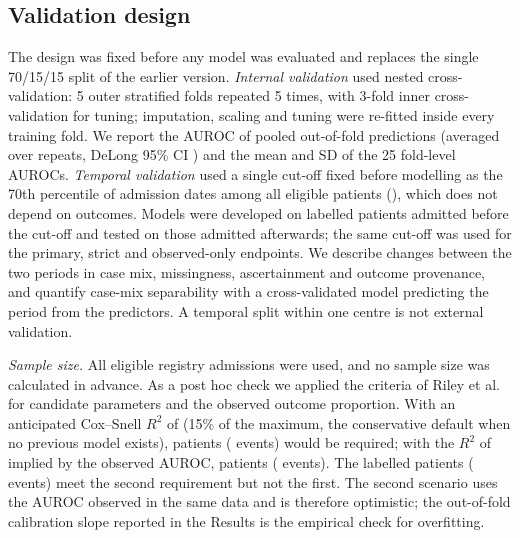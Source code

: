\documentclass[preprint,10pt]{elsarticle}
\begin{document}
\subsection{Validation design}
\label{sec:validation}
The design was fixed before any model was evaluated and replaces the single 70/15/15 split of the earlier version. \emph{Internal validation} used nested cross-validation: 5 outer stratified folds repeated 5 times, with 3-fold inner cross-validation for tuning; imputation, scaling and tuning were re-fitted inside every training fold. We report the AUROC of pooled out-of-fold predictions (averaged over repeats, DeLong 95\% CI \cite{delong1988comparing,sun2014fastdelong}) and the mean and SD of the 25 fold-level AUROCs. \emph{Temporal validation} used a single cut-off fixed before modelling as the 70th percentile of admission dates among all eligible patients (\TCut), which does not depend on outcomes. Models were developed on labelled patients admitted before the cut-off and tested on those admitted afterwards; the same cut-off was used for the primary, strict and observed-only endpoints. We describe changes between the two periods in case mix, missingness, ascertainment and outcome provenance, and quantify case-mix separability with a cross-validated model predicting the period from the predictors. A temporal split within one centre is not external validation.

\emph{Sample size.} All eligible registry admissions were used, and no sample size was calculated in advance. As a post hoc check we applied the criteria of Riley et al.\ \cite{riley2020samplesize} for \Ncand{} candidate parameters and the observed outcome proportion. With an anticipated Cox--Snell $R^2$ of \RileyConsRsq{} (15\% of the maximum, the conservative default when no previous model exists), \RileyConsN{} patients (\RileyConsE{} events) would be required; with the $R^2$ of \RileyCRsq{} implied by the observed AUROC, \RileyCN{} patients (\RileyCE{} events). The \Nlab{} labelled patients (\Ndeaths{} events) meet the second requirement but not the first. The second scenario uses the AUROC observed in the same data and is therefore optimistic; the out-of-fold calibration slope reported in the Results is the empirical check for overfitting.
\end{document}
